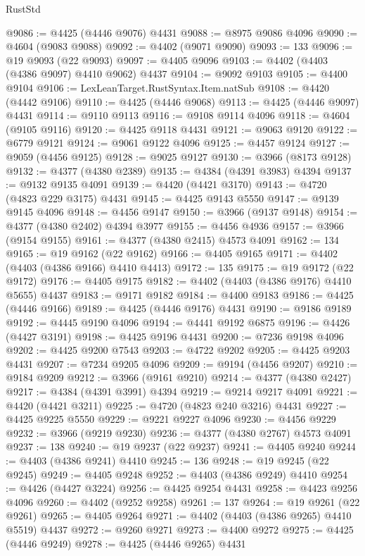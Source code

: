 \begin{lexlean}{RustStd}
\begin{coremodule}
@9086 := @4425 (@4446 @9076) @4431
@9088 := @8975 @9086 @4096
@9090 := @4604 (@9083 @9088)
@9092 := @4402 (@9071 @9090)
@9093 := 133
@9096 := @19 @9093 (@22 @9093)
@9097 := @4405 @9096
@9103 := @4402 (@4403 (@4386 @9097) @4410 @9062) @4437
@9104 := @9092 @9103
@9105 := @4400 @9104
@9106 := LexLeanTarget.RustSyntax.Item.natSub
@9108 := @4420 (@4442 @9106)
@9110 := @4425 (@4446 @9068)
@9113 := @4425 (@4446 @9097) @4431
@9114 := @9110 @9113
@9116 := @9108 @9114 @4096
@9118 := @4604 (@9105 @9116)
@9120 := @4425 @9118 @4431
@9121 := @9063 @9120
@9122 := @6779 @9121
@9124 := @9061 @9122 @4096
@9125 := @4457 @9124
@9127 := @9059 (@4456 @9125)
@9128 := @9025 @9127
@9130 := @3966 (@8173 @9128)
@9132 := @4377 (@4380 @2389)
@9135 := @4384 (@4391 @3983) @4394
@9137 := @9132 @9135 @4091
@9139 := @4420 (@4421 @3170)
@9143 := @4720 (@4823 @229 @3175) @4431
@9145 := @4425 @9143 @5550
@9147 := @9139 @9145 @4096
@9148 := @4456 @9147
@9150 := @3966 (@9137 @9148)
@9154 := @4377 (@4380 @2402) @4394 @3977
@9155 := @4456 @4936
@9157 := @3966 (@9154 @9155)
@9161 := @4377 (@4380 @2415) @4573 @4091
@9162 := 134
@9165 := @19 @9162 (@22 @9162)
@9166 := @4405 @9165
@9171 := @4402 (@4403 (@4386 @9166) @4410 @4413)
@9172 := 135
@9175 := @19 @9172 (@22 @9172)
@9176 := @4405 @9175
@9182 := @4402 (@4403 (@4386 @9176) @4410 @5655) @4437
@9183 := @9171 @9182
@9184 := @4400 @9183
@9186 := @4425 (@4446 @9166)
@9189 := @4425 (@4446 @9176) @4431
@9190 := @9186 @9189
@9192 := @4445 @9190 @4096
@9194 := @4441 @9192 @6875
@9196 := @4426 (@4427 @3191)
@9198 := @4425 @9196 @4431
@9200 := @7236 @9198 @4096
@9202 := @4425 @9200 @7543
@9203 := @4722 @9202
@9205 := @4425 @9203 @4431
@9207 := @7234 @9205 @4096
@9209 := @9194 (@4456 @9207)
@9210 := @9184 @9209
@9212 := @3966 (@9161 @9210)
@9214 := @4377 (@4380 @2427)
@9217 := @4384 (@4391 @3991) @4394
@9219 := @9214 @9217 @4091
@9221 := @4420 (@4421 @3211)
@9225 := @4720 (@4823 @240 @3216) @4431
@9227 := @4425 @9225 @5550
@9229 := @9221 @9227 @4096
@9230 := @4456 @9229
@9232 := @3966 (@9219 @9230)
@9236 := @4377 (@4380 @2767) @4573 @4091
@9237 := 138
@9240 := @19 @9237 (@22 @9237)
@9241 := @4405 @9240
@9244 := @4403 (@4386 @9241) @4410
@9245 := 136
@9248 := @19 @9245 (@22 @9245)
@9249 := @4405 @9248
@9252 := @4403 (@4386 @9249) @4410
@9254 := @4426 (@4427 @3224)
@9256 := @4425 @9254 @4431
@9258 := @4423 @9256 @4096
@9260 := @4402 (@9252 @9258)
@9261 := 137
@9264 := @19 @9261 (@22 @9261)
@9265 := @4405 @9264
@9271 := @4402 (@4403 (@4386 @9265) @4410 @5519) @4437
@9272 := @9260 @9271
@9273 := @4400 @9272
@9275 := @4425 (@4446 @9249)
@9278 := @4425 (@4446 @9265) @4431

\end{coremodule}
\end{lexlean}
